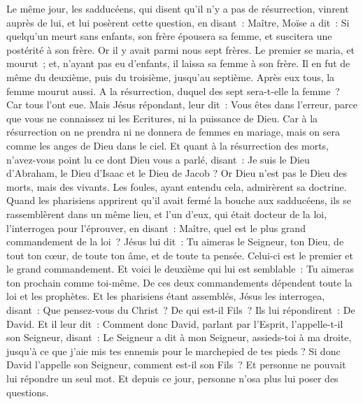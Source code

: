 \begin{multicols}{2}
Le même jour, les sadducéens, qui disent qu'il n'y a pas de résurrection, vinrent auprès de lui, et lui posèrent cette question,
en disant~: Maître, Moïse a dit~: Si quelqu'un meurt sans enfants, son frère épousera sa femme, et suscitera une postérité à son frère.
Or il y avait parmi nous sept frères. Le premier se maria, et mourut~; et, n'ayant pas eu d'enfants, il laissa sa femme à son frère.
Il en fut de même du deuxième, puis du troisième, jusqu'au septième.
Après eux tous, la femme mourut aussi.
A la résurrection, duquel des sept sera-t-elle la femme~? Car tous l'ont eue.
Mais Jésus répondant, leur dit~: Vous êtes dans l'erreur, parce que vous ne connaissez ni les Ecritures, ni la puissance de Dieu.
Car à la résurrection on ne prendra ni ne donnera de femmes en mariage, mais on sera comme les anges de Dieu dans le ciel.
Et quant à la résurrection des morts, n'avez-vous point lu ce dont Dieu vous a parlé, disant~:
Je suis le Dieu d'Abraham, le Dieu d'Isaac et le Dieu de Jacob ? Or Dieu n'est pas le Dieu des morts, mais des vivants.
Les foules, ayant entendu cela, admirèrent sa doctrine.
Quand les pharisiens apprirent qu'il avait fermé la bouche aux sadducéens, ils se rassemblèrent dans un même lieu,
et l'un d'eux, qui était docteur de la loi, l'interrogea pour l'éprouver, en disant~:
Maître, quel est le plus grand commandement de la loi~?
Jésus lui dit~: Tu aimeras le Seigneur, ton Dieu, de tout ton cœur, de toute ton âme, et de toute ta pensée.
Celui-ci est le premier et le grand commandement.
Et voici le deuxième qui lui est semblable~: Tu aimeras ton prochain comme toi-même.
De ces deux commandements dépendent toute la loi et les prophètes.
Et les pharisiens étant assemblés, Jésus les interrogea,
disant~: Que pensez-vous du Christ~? De qui est-il Fils~? Ils lui répondirent~: De David.
Et il leur dit~: Comment donc David, parlant par l'Esprit, l'appelle-t-il son Seigneur, disant~:
Le Seigneur a dit à mon Seigneur, assieds-toi à ma droite, jusqu'à ce que j'aie mis tes ennemis pour le marchepied de tes pieds ?
Si donc David l'appelle son Seigneur, comment est-il son Fils~?
Et personne ne pouvait lui répondre un seul mot. Et depuis ce jour, personne n'osa plus lui poser des questions.

\end{multicols}
